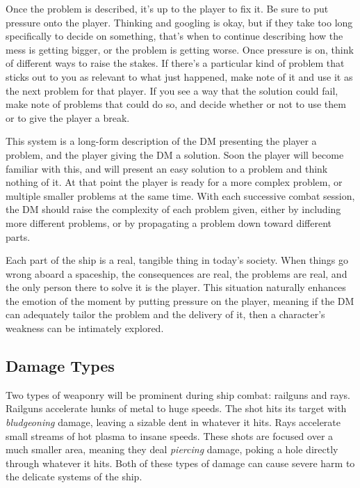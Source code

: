 \documentclass[a4paper]{article}
\begin{document}
Once the problem is described, it's up to the player to fix it. Be sure to put pressure onto the player. Thinking and googling is okay, but if they take too long specifically to decide on something, that's when to continue describing how the mess is getting bigger, or the problem is getting worse. Once pressure is on, think of different ways to raise the stakes. If there's a particular kind of problem that sticks out to you as relevant to what just happened, make note of it and use it as the next problem for that player. If you see a way that the solution could fail, make note of problems that could do so, and decide whether or not to use them or to give the player a break.

This system is a long-form description of the DM presenting the player a problem, and the player giving the DM a solution. Soon the player will become familiar with this, and will present an easy solution to a problem and think nothing of it. At that point the player is ready for a more complex problem, or multiple smaller problems at the same time. With each successive combat session, the DM should raise the complexity of each problem given, either by including more different problems, or by propagating a problem down toward different parts.

Each part of the ship is a real, tangible thing in today's society. When things go wrong aboard a spaceship, the consequences are real, the problems are real, and the only person there to solve it is the player. This situation naturally enhances the emotion of the moment by putting pressure on the player, meaning if the DM can adequately tailor the problem and the delivery of it, then a character's weakness can be intimately explored.

\subsection{Damage Types} \label{damage_types}

Two types of weaponry will be prominent during ship combat: railguns and rays. Railguns accelerate hunks of metal to huge speeds. The shot hits its target with \textit{bludgeoning} damage, leaving a sizable dent in whatever it hits. Rays accelerate small streams of hot plasma to insane speeds. These shots are focused over a much smaller area, meaning they deal \textit{piercing} damage, poking a hole directly through whatever it hits. Both of these types of damage can cause severe harm to the delicate systems of the ship.
\end{document}
